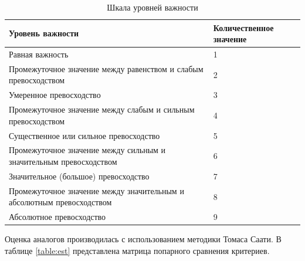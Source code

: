 	\begin{table}[h!]
		\begin{raggedright}
			\caption{Шкала уровней важности}
			\begin{tabular}{ | p{} | p{} | }
				\hline
				Уровень важности & Количественное значение \\
				\hline
				Равная важность & 1 \\
				\hline
				Промежуточное значение между равенством и слабым превосходством & 2 \\
				\hline
				Умеренное превосходство & 3 \\
				\hline
				Промежуточное значение между слабым и сильным превосходством & 4 \\
				\hline
				Существенное или сильное превосходство & 5 \\
				\hline
				Промежуточное значение между сильным и значительным превосходством & 6 \\
				\hline
				Значительное (большое) превосходство & 7 \\
				\hline
				Промежуточное значение между значительным и абсолютным превосходством & 8 \\
				\hline
				Абсолютное превосходство & 9 \\
				\hline
			\end{tabular}
			\label{table:scale}
		\end{raggedright}
	\end{table}

	\pagebreak

	Оценка аналогов производилась с использованием методики Томаса Саати. В таблице \ref{table:est} представлена матрица попарного сравнения критериев.

